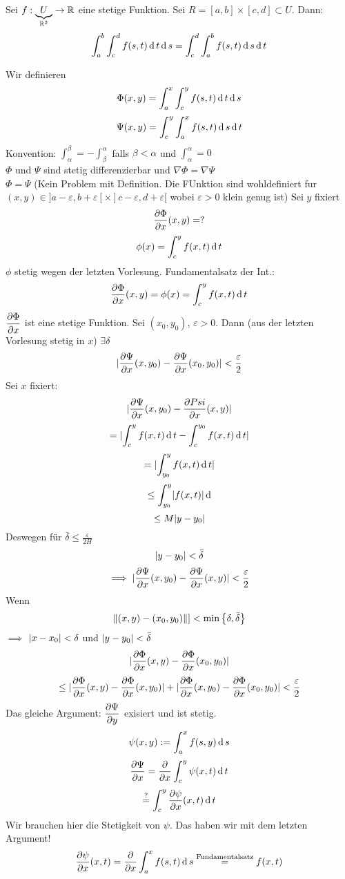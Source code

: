 \begin{Sat}
  Sei $f:\underbrace{U}_{\mathbb{R}^2}\rightarrow\mathbb{R}$ eine stetige Funktion. Sei $R=[a,b]\times [c,d]\subset U$. Dann:
  \[\int_a^b\int_c^d f(s,t)\operatorname{d} t\operatorname{d} s=\int_c^d\int_a^b f(s,t)\operatorname{d} s\operatorname{d} t\]
\end{Sat}
\begin{Bew}
  Wir definieren
  \[\Phi(x,y)=\int_a^x\int_c^yf(s,t)\operatorname{d} t\operatorname{d} s\]
  \[\Psi(x,y)=\int_c^y\int_a^x f(s,t)\operatorname{d} s\operatorname{d} t\]
  Konvention: $\int_\alpha^\beta = -\int_\beta^\alpha$ falls $\beta<\alpha$ und $\int_\alpha^\alpha=0$ \\
    $\Phi$ und $\Psi$ sind stetig differenzierbar und $\nabla \Phi = \nabla\Psi$ \\
    $\Phi=\Psi$ (Kein Problem mit Definition. Die FUnktion sind wohldefiniert fur $(x,y)\in ]a-\varepsilon,b+\varepsilon[\times ]c-\varepsilon,d+\varepsilon [$ wobei $\varepsilon>0$ klein genug ist)
  Sei $y$ fixiert
  \[\dfrac{\partial \Phi}{\partial x}(x,y) = ?\]
  \[\phi(x)=\int_c^yf(x,t)\operatorname{d} t\]
  $\phi$ stetig wegen der letzten Vorlesung. Fundamentalsatz der Int.:
  \[\dfrac{\partial \Phi}{\partial x}(x,y)=\phi(x)=\int_c^y f(x,t)\operatorname{d} t\]
    $\dfrac{\partial \Phi}{\partial x}$ ist eine stetige Funktion.
    Sei $(x_0,y_0)$, $\varepsilon>0$. Dann (aus der letzten Vorlesung stetig in $x$) $\exists \delta$
    \[\mathopen| \dfrac{\partial \Psi}{\partial x}(x,y_0)-\dfrac{\partial \Psi}{\partial x}(x_0,y_0) \mathclose|<\frac{\varepsilon}{2}\]
  Sei $x$ fixiert:
  \[\mathopen| \dfrac{\partial \Psi}{\partial x}(x,y_0)-\dfrac{\partial Psi}{\partial x}(x,y) \mathclose|\]
  \[=\mathopen| \int_c^yf(x,t)\operatorname{d} t-\int_c^{y_0}f(x,t)\operatorname{d} t \mathclose|\]
  \[=\mathopen| \int_{y_0}^yf(x,t)\operatorname{d} t \mathclose|\]
  \[\leq \int_{y_0}^y\mathopen| f(x,t) \mathclose|\operatorname{d}\]
  \[\leq M\mathopen| y-y_0 \mathclose|\]
  Deswegen
  für $\bar\delta \leq \frac{\varepsilon}{2H}$
  \[\mathopen| y-y_0 \mathclose|<\bar\delta\]
  \[\implies \mathopen| \dfrac{\partial \Psi}{\partial x}(x,y_0)-\dfrac{\partial \Psi}{\partial x}(x,y) \mathclose|<\frac{\varepsilon}{2}\]
  Wenn
  \[\left\| (x,y)-(x_0,y_0) \right\|]<\min \left\{ \delta,\bar\delta \right\} \]
  $\implies$ $\mathopen| x-x_0 \mathclose|<\delta$ und $\mathopen| y-y_0 \mathclose|<\bar\delta$
  \[\mathopen| \dfrac{\partial \Phi}{\partial x}(x,y)-\dfrac{\partial \Phi}{\partial x}(x_0,y_0) \mathclose|\]
  \[\leq \mathopen| \dfrac{\partial \Phi}{\partial x}(x,y)-\dfrac{\partial \Phi}{\partial x}(x,y_0) \mathclose|+\mathopen| \dfrac{\partial \Phi}{\partial x}(x,y_0)-\dfrac{\partial \Phi}{\partial x}(x_0,y_0) \mathclose|<\frac{\varepsilon}{2}\]
  Das gleiche Argument: $\dfrac{\partial \Psi}{\partial y}$ exisiert und ist stetig.
  \[\psi(x,y):=\int_a^xf(s,y)\operatorname{d} s\]
  \[\dfrac{\partial \Psi}{\partial x}=\dfrac{\partial }{\partial x}\int_c^y\psi(x,t)\operatorname{d} t\]
  \[\stackrel{?}{=}\int_c^y\dfrac{\partial \psi}{\partial x}(x,t)\operatorname{d} t\]
  Wir brauchen hier die Stetigkeit von $\psi$. Das haben wir mit dem letzten Argument!
  \begin{equation}
    \label{e:1104062}
    \Part{\psi}{x}(x,t)=\Part{}{x}\int_a^xf(s,t)\md s\stackrel{\text{Fundamentalsatz}}{=}f(x,t)

\end{equation}
\end{Bew}
